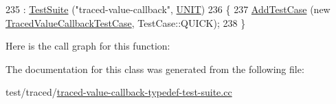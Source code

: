 \begin{DoxyCode}
235   : \hyperlink{classns3_1_1TestSuite_a904b0c40583b744d30908aeb94636d1a}{TestSuite} (\textcolor{stringliteral}{"traced-value-callback"}, \hyperlink{classns3_1_1TestSuite_a1ebfcab34ec8161e085e8e3a1855eae0a3885375a3787abf60431f8454b3cadbd}{UNIT})
236 \{
237   \hyperlink{classns3_1_1TestCase_a3718088e3eefd5d6454569d2e0ddd835}{AddTestCase} (\textcolor{keyword}{new} \hyperlink{classTracedValueCallbackTestCase}{TracedValueCallbackTestCase}, TestCase::QUICK);
238 \}
\end{DoxyCode}


Here is the call graph for this function\+:




The documentation for this class was generated from the following file\+:\begin{DoxyCompactItemize}
\item 
test/traced/\hyperlink{traced-value-callback-typedef-test-suite_8cc}{traced-\/value-\/callback-\/typedef-\/test-\/suite.\+cc}\end{DoxyCompactItemize}
